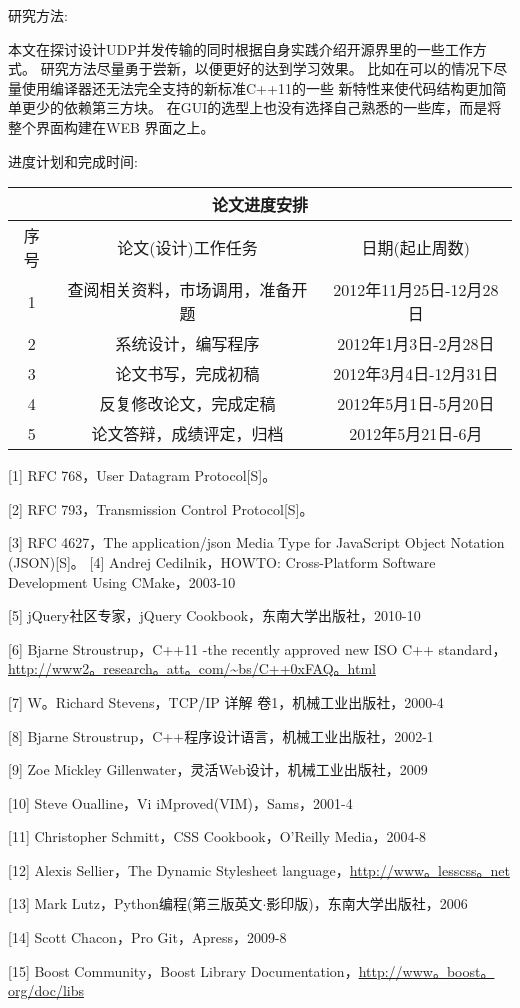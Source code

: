 \documentclass{data/hbue}
\begin{document}
\reportschedule
{
\begin{description}
	\item{研究方法:}

		本文在探讨设计UDP并发传输的同时根据自身实践介绍开源界里的一些工作方式。
		研究方法尽量勇于尝新，以便更好的达到学习效果。
		比如在可以的情况下尽量使用编译器还无法完全支持的新标准C++11的一些
		新特性来使代码结构更加简单更少的依赖第三方块。
		在GUI的选型上也没有选择自己熟悉的一些库，而是将整个界面构建在WEB
		界面之上。
	\item{进度计划和完成时间:}

		\begin{tabular}{|c|c|c|}
			\hline
			\multicolumn{3}{|c|}{\sanhao 论文进度安排} \\ 
			\hline
			序号 & 论文\-(设计)工作任务 & 日期\-(起止周数) \\
			\hline
			1	& 查阅相关资料，市场调用，准备开题 & 2012年11月25日-12月28日 \\
			\hline
			2	& 系统设计，编写程序 & 2012年1月3日-2月28日 \\
			\hline
			3	& 论文书写，完成初稿 & 2012年3月4日-12月31日 \\
			\hline
			4	& 反复修改论文，完成定稿 & 2012年5月1日-5月20日 \\
			\hline
			5	& 论文答辩，成绩评定，归档 & 2012年5月21日-6月 \\
			\hline
		\end{tabular}

\end{description}
}

\reportreference
{
[1] RFC 768，User Datagram Protocol[S]。

[2] RFC 793，Transmission Control Protocol[S]。

[3] RFC 4627，The application/json Media Type for JavaScript Object
	Notation (JSON)[S]。
[4] Andrej Cedilnik，HOWTO: Cross-Platform Software Development
Using CMake，2003-10

[5] jQuery社区专家，jQuery Cookbook，东南大学出版社，2010-10

[6] Bjarne Stroustrup，C++11 -the recently approved new ISO C++ standard，
\url{http://www2。research。att。com/~bs/C++0xFAQ。html}

[7] W。Richard Stevens，TCP/IP 详解 卷1，机械工业出版社，2000-4

[8] Bjarne Stroustrup，C++程序设计语言，机械工业出版社，2002-1

[9] Zoe Mickley Gillenwater，灵活Web设计，机械工业出版社，2009

[10] Steve Oualline，Vi iMproved(VIM)，Sams，2001-4

[11] Christopher Schmitt，CSS Cookbook，O'Reilly Media，2004-8

[12] Alexis Sellier，The Dynamic Stylesheet language，\url{http://www。lesscss。net}

[13] Mark Lutz，Python编程(第三版英文$\cdot$影印版)，东南大学出版社，2006

[14] Scott Chacon，Pro Git，Apress，2009-8

[15] Boost Community，Boost Library Documentation，\url{http://www。boost。org/doc/libs}
}

\reportsuggestion
{
}


\end{document}
